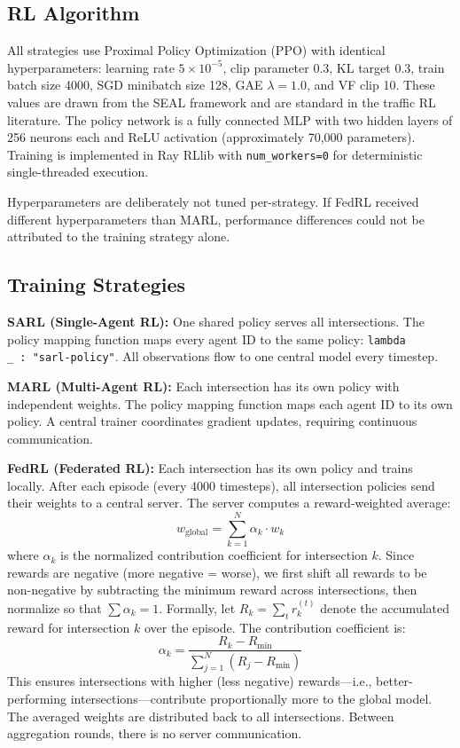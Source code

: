 \documentclass[conference]{IEEEtran}
\begin{document}
\subsection{RL Algorithm}

All strategies use Proximal Policy Optimization (PPO) \cite{b_ppo} with identical hyperparameters: learning rate $5 \times 10^{-5}$, clip parameter 0.3, KL target 0.3, train batch size 4000, SGD minibatch size 128, GAE $\lambda = 1.0$, and VF clip 10. These values are drawn from the SEAL framework \cite{b_seal} and are standard in the traffic RL literature. The policy network is a fully connected MLP with two hidden layers of 256 neurons each and ReLU activation (approximately 70,000 parameters). Training is implemented in Ray RLlib \cite{b_rllib} with \texttt{num\_workers=0} for deterministic single-threaded execution.

Hyperparameters are deliberately not tuned per-strategy. If FedRL received different hyperparameters than MARL, performance differences could not be attributed to the training strategy alone.

\subsection{Training Strategies}

\textbf{SARL (Single-Agent RL):} One shared policy serves all intersections. The policy mapping function maps every agent ID to the same policy: \texttt{lambda \_\,:\,"sarl{-}policy"}. All observations flow to one central model every timestep.

\textbf{MARL (Multi-Agent RL):} Each intersection has its own policy with independent weights. The policy mapping function maps each agent ID to its own policy. A central trainer coordinates gradient updates, requiring continuous communication.

\textbf{FedRL (Federated RL):} Each intersection has its own policy and trains locally. After each episode (every 4000 timesteps), all intersection policies send their weights to a central server. The server computes a reward-weighted average:
\begin{equation}
    w_{\text{global}} = \sum_{k=1}^{N} \alpha_k \cdot w_k
    \label{eq:fedavg}
\end{equation}
where $\alpha_k$ is the normalized contribution coefficient for intersection $k$. Since rewards are negative (more negative = worse), we first shift all rewards to be non-negative by subtracting the minimum reward across intersections, then normalize so that $\sum \alpha_k = 1$. Formally, let $R_k = \sum_t r_k^{(t)}$ denote the accumulated reward for intersection $k$ over the episode. The contribution coefficient is:
\begin{equation}
    \alpha_k = \frac{R_k - R_{\min}}{\sum_{j=1}^{N}(R_j - R_{\min})}
    \label{eq:alpha}
\end{equation}
This ensures intersections with higher (less negative) rewards---i.e., better-performing intersections---contribute proportionally more to the global model. The averaged weights are distributed back to all intersections. Between aggregation rounds, there is no server communication.
\end{document}
